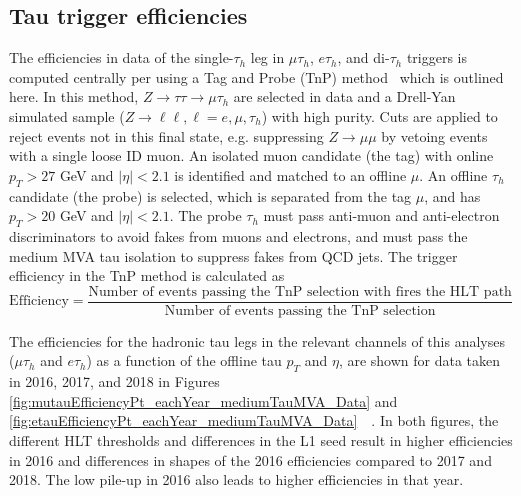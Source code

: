 \subsection{Tau trigger efficiencies}
The efficiencies in data of the single-$\tau_{h}$ leg in $\mu\tau_{h}$, $e\tau_{h}$, and di-$\tau_{h}$ triggers is computed centrally per using a Tag and Probe (TnP) method~\cite{CMS-DP-2019-012} which is outlined here. In this method, $Z \rightarrow \tau\tau \rightarrow \mu\tau_{h}$ are selected in data and a Drell-Yan simulated sample ($Z \rightarrow \ell\ell, \ell = e, \mu, \tau_{h}$) with high purity. Cuts are applied to reject events not in this final state, e.g. suppressing $Z \rightarrow \mu\mu$ by vetoing events with a single loose ID muon. An isolated muon candidate (the tag) with online $p_{T} > 27$ GeV and $|\eta| < 2.1$ is identified and matched to an offline $\mu$. An offline $\tau_{h}$ candidate (the probe) is selected, which is separated from the tag $\mu$, and has $p_{T} > 20$ GeV and $|\eta| < 2.1$. The probe $\tau_{h}$ must pass anti-muon and anti-electron discriminators to avoid fakes from muons and electrons, and must pass the medium MVA tau isolation to suppress fakes from QCD jets. The trigger efficiency in the TnP method is calculated as 
\begin{equation}
    \text{Efficiency} = \frac{\text{Number of events passing the TnP selection with fires the HLT path}}{\text{Number of events passing the TnP selection}}
\end{equation}


The efficiencies for the hadronic tau legs in the relevant channels of this analyses ($\mu\tau_{h}$ and $e\tau_{h}$) as a function of the offline tau $p_{T}$ and $\eta$, are shown for data taken in 2016, 2017, and 2018 in Figures \ref{fig:mutauEfficiencyPt_eachYear_mediumTauMVA_Data} and \ref{fig:etauEfficiencyPt_eachYear_mediumTauMVA_Data}~\cite{CMS-DP-2019-012}~\cite{twiki_Tau_Lepton_Run_2_trigger_performance}. In both figures, the different HLT thresholds and differences in the L1 seed result in higher efficiencies in 2016 and differences in shapes of the 2016 efficiencies compared to 2017 and 2018. The low pile-up in 2016 also leads to higher efficiencies in that year.


